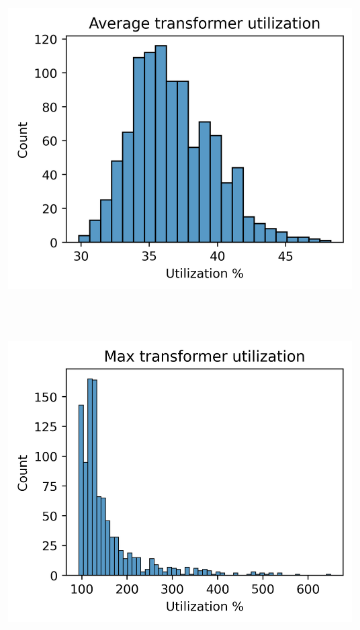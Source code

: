 \begin{figure}[H]
\begin{subfigure}{.33\textwidth}
    \label{fig:appendix:suburb2:histograms:max_cable}
  \end{subfigure}
  \begin{subfigure}{.33\textwidth}
      \centering
      \includegraphics[width=\linewidth]{img/switchstate_exploring/suburb2/histograms/avg_trafo_util.png}
      \caption{}
      \label{fig:appendix:suburb2:histograms:avg_trafo}
    \end{subfigure}\\
    \begin{subfigure}{.33\textwidth}
      \centering
      \includegraphics[width=\linewidth]{img/switchstate_exploring/suburb2/histograms/max_trafo_util.png}

\end{subfigure}
\end{figure}
